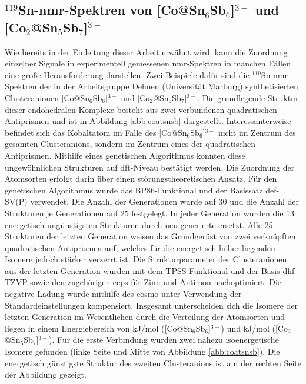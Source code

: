 \subsection{\texorpdfstring{$^{119}$Sn-\acs{nmr}-Spektren von [Co@Sn$_6$Sb$_6$]$^{3-}$ und [Co$_2$@Sn$_5$Sb$_7$]$^{3-}$}{119Sn-NMR Spektren von [Co at Sn\_6Sb\_6]3- und [Co\_2 at Sn\_5Sb\_7]3-}}
Wie bereits in der Einleitung dieser Arbeit erwähnt wird, kann die Zuordnung einzelner Signale in experimentell gemessenen \ac{nmr}-Spektren in manchen Fällen eine große Herausforderung darstellen. Zwei Beispiele dafür sind die $^{119}$Sn-\ac{nmr}-Spektren der in der Arbeitsgruppe Dehnen (Universität Marburg) synthetisierten Clus\-ter\-an\-io\-nen [Co@Sn$_6$Sb$_6$]$^{3-}$ und [Co$_2$@Sn$_5$Sb$_7$]$^{3-}$.\supercite{wilson2018structure} Die grundlegende Struktur dieser endohedralen Komplexe besteht aus zwei verbundenen quadratischen Antiprismen und ist in Abbildung \ref{abb:coatsnsb} dargestellt. Interessanterweise befindet sich das Ko\-balt\-atom im Falle des [Co@Sn$_6$Sb$_6$]$^{3-}$ nicht im Zentrum des gesamten Clusteranions, sondern im Zentrum eines der quadratischen Antiprismen. Mithilfe eines genetischen Algorithmus\supercite{weigend2014extending} konnten diese ungewöhnlichen Strukturen auf \ac{dft}-Niveau bestätigt werden. Die Zuordnung der Atomsorten erfolgt darin über einen störungstheoretischen Ansatz. Für den genetischen Algorithmus wurde das BP86-Funktional\supercite{perdew1986density,becke1988density} und der Basissatz def-SV(P)\supercite{eichkorn1997auxiliary} verwendet. Die Anzahl der Generationen wurde auf 30 und die Anzahl der Strukturen je Generationen auf 25 festgelegt. In jeder Generation wurden die 13 energetisch ungünstigsten Strukturen durch neu generierte ersetzt. Alle 25 Strukturen der letzten Generation weisen das Grundgerüst von zwei verknüpften quadratischen Antiprismen auf, welches für die energetisch höher liegenden Isomere jedoch stärker verzerrt ist. Die Strukturparameter der Clusteranionen aus der letzten Generation wurden  mit dem TPSS-Funktional\supercite{tao2003climbing} und der Basis dhf-TZVP\supercite{weigend2010segmented} sowie den zugehörigen \acp{ecp}\supercite{metz2000small} für Zinn und Antimon nachoptimiert. Die negative Ladung wurde mithilfe des \ac{cosmo}\supercite{klamt1993cosmo} unter Verwendung der Standardeinstellungen kompensiert. Insgesamt unterscheiden sich die Isomere der letzten Generation im Wesentlichen durch die Verteilung der Atomsorten und liegen in einem Energiebereich von \unit[37]{kJ/mol} ([Co@Sn$_6$Sb$_6$]$^{3-}$) und \unit[22]{kJ/mol} ([Co$_2$@Sn$_5$Sb$_7$]$^{3-}$). Für die erste Verbindung wurden zwei nahezu isoenergetische Isomere gefunden (linke Seite und Mitte von Abbildung \ref{abb:coatsnsb}). Die energetisch günstigste Struktur des zweiten Clusteranions ist auf der rechten Seite der Abbildung gezeigt.

